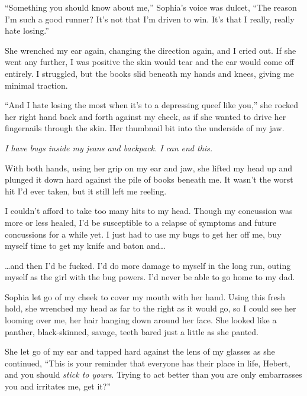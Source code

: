 ``Something you should know about me,'' Sophia's voice was dulcet, ``The reason I'm such a good runner?  It's not that I'm driven to win.  It's that I really, really hate losing.''



She wrenched my ear again, changing the direction again, and I cried out.  If she went any further, I was positive the skin would tear and the ear would come off entirely.  I struggled, but the books slid beneath my hands and knees, giving me minimal traction.



``And I hate losing the most when it's to a depressing queef like you,'' she rocked her right hand back and forth against my cheek, as if she wanted to drive her fingernails through the skin.  Her thumbnail bit into the underside of my jaw.



\emph{I have bugs inside my jeans and backpack.  I can end this.}



With both hands, using her grip on my ear and jaw, she lifted my head up and plunged it down hard against the pile of books beneath me.  It wasn't the worst hit I'd ever taken, but it still left me reeling.



I couldn't afford to take too many hits to my head.  Though my concussion was more or less healed, I'd be susceptible to a relapse of symptoms and future concussions for a while yet.  I just had to use my bugs to get her off me, buy myself time to get my knife and baton and\ldots



\ldots{}and then I'd be fucked.  I'd do more damage to myself in the long run, outing myself as the girl with the bug powers.  I'd never be able to go home to my dad.



Sophia let go of my cheek to cover my mouth with her hand.  Using this fresh hold, she wrenched my head as far to the right as it would go, so I could see her looming over me, her hair hanging down around her face.  She looked like a panther, black-skinned, savage, teeth bared just a little as she panted.



She let go of my ear and tapped hard against the lens of my glasses as she continued, ``This is your reminder that everyone has their place in life, Hebert, and you should \emph{stick to yours}.  Trying to act better than you are only embarrasses you and irritates me, get it?''



